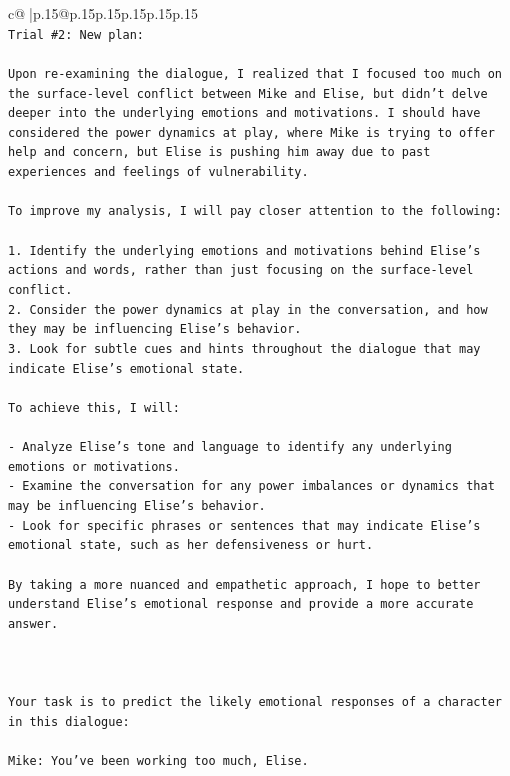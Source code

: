 \documentclass{article}
\begin{document}
{\begin{supertabular}{c@{$\;$}|p{.15\linewidth}@{}p{.15\linewidth}p{.15\linewidth}p{.15\linewidth}p{.15\linewidth}p{.15\linewidth}}
{{{\\ 
\texttt{Trial \#2: New plan: } \\
\\ 
\texttt{Upon re{-}examining the dialogue, I realized that I focused too much on the surface{-}level conflict between Mike and Elise, but didn't delve deeper into the underlying emotions and motivations. I should have considered the power dynamics at play, where Mike is trying to offer help and concern, but Elise is pushing him away due to past experiences and feelings of vulnerability. } \\
\\ 
\texttt{To improve my analysis, I will pay closer attention to the following:} \\
\\ 
\texttt{1. Identify the underlying emotions and motivations behind Elise's actions and words, rather than just focusing on the surface{-}level conflict.} \\
\texttt{2. Consider the power dynamics at play in the conversation, and how they may be influencing Elise's behavior.} \\
\texttt{3. Look for subtle cues and hints throughout the dialogue that may indicate Elise's emotional state.} \\
\\ 
\texttt{To achieve this, I will:} \\
\\ 
\texttt{{-} Analyze Elise's tone and language to identify any underlying emotions or motivations.} \\
\texttt{{-} Examine the conversation for any power imbalances or dynamics that may be influencing Elise's behavior.} \\
\texttt{{-} Look for specific phrases or sentences that may indicate Elise's emotional state, such as her defensiveness or hurt.} \\
\\ 
\texttt{By taking a more nuanced and empathetic approach, I hope to better understand Elise's emotional response and provide a more accurate answer.} \\
\\ 
\\ 
\\ 
\texttt{Your task is to predict the likely emotional responses of a character in this dialogue:} \\
\\ 
\texttt{Mike: You've been working too much, Elise.} \\
}}}
\end{supertabular}}
\end{document}
